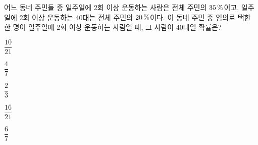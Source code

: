 어느 동네 주민들 중 일주일에 2회 이상 운동하는 사람은 전체 주민의 $35\mkern3mu \%$이고, 일주일에 2회 이상 운동하는 40대는 전체 주민의 $20\mkern3mu \%$이다. 이 동네 주민 중 임의로 택한 한 명이 일주일에 2회 이상 운동하는 사람일 때, 그 사람이 40대일 확률은?
\begin{choicesii}{\rule[-3ex]{0pt}{8ex}$\dfrac{10}{21}$}{\rule[-3ex]{0pt}{8ex}$\dfrac{4}{7}$}{\rule[-3ex]{0pt}{8ex}$\dfrac{2}{3}$}{\rule[-3ex]{0pt}{8ex}$\dfrac{16}{21}$}{\rule[-3ex]{0pt}{8ex}$\dfrac{6}{7}$}\end{choicesii}
